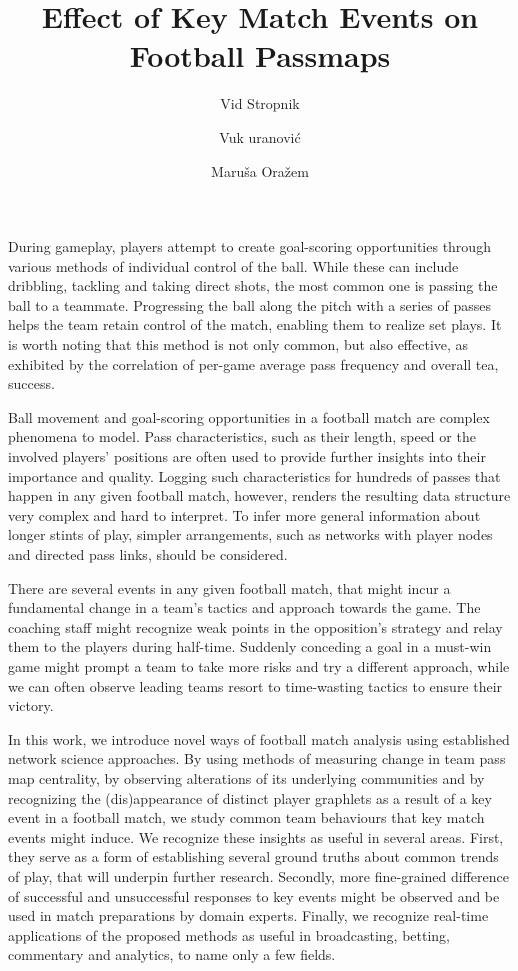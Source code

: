 \documentclass[9pt,twocolumn,twoside]{pnas-report}
\title{Effect of Key Match Events on Football Passmaps}
\author[a,1]{Vid Stropnik}
\author[a]{Vuk \DJ uranović}
\author[a]{Maruša Oražem}
\affil[a]{University of Ljubljana, Faculty of Computer and Information Science, Ve\v{c}na pot 113, SI-1000 Ljubljana, Slovenia}
\begin{document}
\maketitle
\thispagestyle{firststyle}



 During gameplay, players attempt to create goal-scoring opportunities through various methods of individual control of the ball. While these can include dribbling, tackling and taking direct shots, the most common one is passing the ball to a teammate. Progressing the ball along the pitch with a series of passes helps the team retain control of the match, enabling them to realize set plays. It is worth noting that this method is not only common, but also effective, as exhibited by the correlation of per-game average pass frequency and overall tea, success. \cite{plpasses}

Ball movement and goal-scoring opportunities in a football match are complex phenomena to model. Pass characteristics, such as their length, speed or the involved players' positions are often used to provide further insights into their importance and quality. Logging such characteristics for hundreds of passes that happen in any given football match, however, renders the resulting data structure very complex and hard to interpret. To infer more general information about longer stints of play, simpler arrangements, such as networks with player nodes and directed pass links, should be considered.

There are several events in any given football match, that might incur a fundamental change in a team's tactics and approach towards the game. The coaching staff might recognize weak points in the opposition's strategy and relay them to the players during half-time. Suddenly conceding a goal in a must-win game might prompt a team to take more risks and try a different approach, while we can often observe leading teams resort to time-wasting tactics to ensure their victory. 

In this work, we introduce novel ways of football match analysis using established network science approaches. By using methods of measuring change in team pass map centrality, by observing alterations of its underlying communities and by recognizing the (dis)appearance of distinct player graphlets as a result of a key event in a football match, we study common team behaviours that key match events might induce. We recognize these insights as useful in several areas. First, they serve as a form of establishing several ground truths about common trends of play, that will underpin further research. Secondly, more fine-grained difference of successful and unsuccessful responses to key events might be observed and be used in match preparations by domain experts. Finally, we recognize real-time applications of the proposed methods as useful in broadcasting, betting, commentary and analytics, to name only a few fields.
\end{document}
